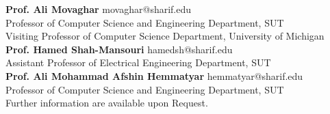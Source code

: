\documentclass[11pt]{article}
\begin{document}
\textbf{Prof. Ali Movaghar} \href{https://scholar.google.com/citations?user=BXNelwwAAAAJ\&hl=en}{\small \faExternalLink} \hfill movaghar@sharif.edu\\
Professor of Computer Science and Engineering Department, SUT \\
Visiting Professor of Computer Science Department, University of Michigan\\
\textbf{Prof. Hamed Shah-Mansouri} \href{https://scholar.google.com/citations?user=dcjIFccAAAAJ&hl=en&oi=ao}{\small \faExternalLink} \hfill  hamedsh@sharif.edu\\
Assistant Professor of Electrical Engineering Department, SUT\\
\textbf{Prof. Ali Mohammad Afshin Hemmatyar} \href{https://scholar.google.com/citations?user=wob0AskAAAAJ&hl=en&oi=ao}{\small \faExternalLink}  \hfill hemmatyar@sharif.edu\\
Professor of Computer Science and Engineering Department, SUT\\
\vfill
Further information are available upon Request.
\end{document}

